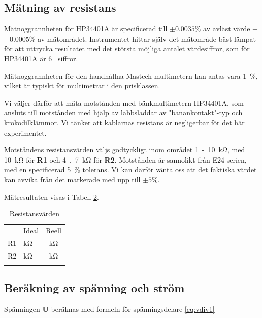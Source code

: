 \documentclass[11pt,a4paper]{article}
\begin{document}
\subsection{Mätning av resistans}\label{vdiv2}
\par Mätnoggrannheten för HP34401A är specificerad till $\pm{}0.0035\%$ av
avläst värde + $\pm{}0.0005\%$ av mätområdet. Instrumentet hittar själv det
mätområde bäst lämpat för att uttrycka resultatet med det största möjliga antalet
värdesiffror, som för HP34401A är \si{6} siffror.
\par Mätnoggrannheten för den handhållna Mastech-multimetern kan antas vara
\si{1\%}, vilket är typiskt för multimetrar i den prisklassen.
\par Vi väljer därför att mäta motstånden med bänkmultimetern HP34401A, som ansluts
till motstånden med hjälp av labbsladdar av "banankontakt"-typ och krokodilklämmor.
Vi tänker att kablarnas resistans är negligerbar för det här experimentet.
\\
\par Motståndens resistansvärden väljs godtyckligt inom området \si{1-10\kohm}, 
med \si{10\kohm} för \textbf{R1} och \si{4,7\kohm} för \textbf{R2}.
Motstånden är sannolikt från E24-serien, med en specificerad \si{5\%} tolerans. Vi kan
därför vänta oss att det faktiska värdet kan avvika från det markerade med upp till
$\pm{}5\%$. 
\par Mätresultaten visas i Tabell \ref{restable}.

\begin{table}
    \begin{longtable}[c]{@{}llc@{}}
        \toprule\addlinespace
           & Ideal                  & Reell
        \\\addlinespace
        \midrule\endhead
        R1 & \unit[10]{\si{\kohm}}  & \unit[9,870]{\si{\kohm}}
        \\\addlinespace
        R2 & \unit[4,7]{\si{\kohm}} & \unit[4,677]{\si{\kohm}}
        \\\addlinespace
        \bottomrule
        \addlinespace
        \caption{Resistansvärden}
        \label{restable}
    \end{longtable}
\end{table}



\subsection{Beräkning av spänning och ström}\label{vdiv_multi}
Spänningen \textbf{U} beräknas med formeln för spänningsdelare \eqref{eq:vdiv1}
\end{document}
